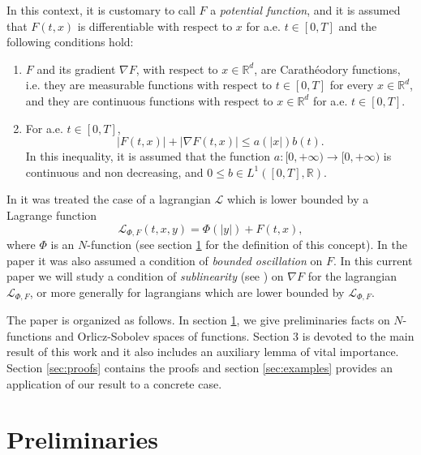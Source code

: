 \documentclass[twoside]{elsarticle}
\makeatletter
\theoremstyle{remark}
\newcommand{\labitem}[2]{%
\def\@itemlabel{\textbf{#1}}
\item
\def\@currentlabel{#1}\label{#2}}
\newcommand{\rr}{\mathbb{R}}
\renewcommand{\leq}{\leqslant}
\newcounter{example}
\makeatother
\begin{document}
In this context, it  is customary to call $F$ a  \emph{potential function}, and it is assumed that $F(t,x)$ is differentiable with respect to $x$ for a.e. $t\in [0,T]$ and the following conditions hold:
\begin{enumerate}
\labitem{(C)}{item:condicion_c} $F$ and its gradient $\nabla F$, with respect to $x\in\rr^d$,  are  Carath\'eodory functions, i.e. they are measurable functions with respect to $t\in [0,T]$ for every  $x\in\rr^d$, and they are continuous functions with  respect to  $x\in\rr^d$ for a.e. $t \in [0,T]$.
 \labitem{(A)}{item:condicion_a}  For   a.e. $t\in [0,T]$,
\begin{equation}
|F(t,x)| + |\nabla F(t,x)|  \leq a(|x|)b(t).
\end{equation}
In this inequality, it is assumed that the function  $a:[0,+\infty)\to [0,+\infty)$ is continuous and non decreasing,
and $0\leq b\in L^1([0,T],\rr)$.
\end{enumerate}


In \cite{ABGMS2015} it was treated  the case of a lagrangian $\mathcal{L}$ which is lower bounded by a Lagrange function
\begin{equation}\label{eq:lagrange_phi}
\mathcal{L}_{\Phi,F}(t,x,y)=\Phi(|y|)+F(t,x),
\end{equation}
where  $\Phi$ is an $N$-function (see section \ref{preliminares} for the definition of this concept).
In the paper \cite{ABGMS2015} it was also assumed  a condition of \emph{bounded oscillation} on $F$.
In this current paper we will study a condition of \emph{sublinearity} (see  \cite{tang1998periodic,wu1999periodic,zhao2004periodic,tang2010periodic,zhao2005existence}) on $\nabla F$ for the lagrangian  $\mathcal{L}_{\Phi,F}$, or more generally for lagrangians which are lower bounded by $\mathcal{L}_{\Phi,F}$.




The paper is organized as follows. In section \ref{preliminares}, we give preliminaries facts on $N$-functions and Orlicz-Sobolev spaces of functions. Section 3 is devoted to the main result of this work and it also includes an auxiliary lemma of vital importance. Section \ref{sec:proofs} contains the proofs and section \ref{sec:examples} provides an application of our result to a concrete case.


\section{Preliminaries}\label{preliminares}
\end{document}
